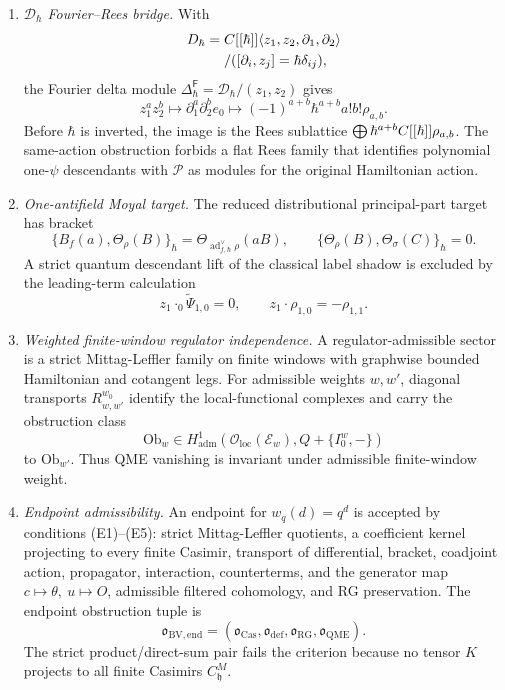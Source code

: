 \begin{enumerate}
  \item \emph{\(\mathcal D_\hbar\) Fourier--Rees bridge.}
  With
  \[
    \begin{aligned}
    D_\hbar
    ={}&
    C[[\hbar]]
      \langle z_1,z_2,\partial_1,\partial_2\rangle\\
    &/
      ([\partial_i,z_j]=\hbar\delta_{ij}),
    \end{aligned}
  \]
  the Fourier delta module
  \(\Delta^{\mathsf F}_\hbar=\mathcal D_\hbar/(z_1,z_2)\) gives
  \[
    z_1^az_2^b\mapsto
    \partial_1^a\partial_2^be_0
    \mapsto
    (-1)^{a+b}\hbar^{a+b}a!b!\rho_{a,b}.
  \]
  Before \(\hbar\) is inverted, the image is the Rees sublattice
  \(\bigoplus\hbar^{a+b}C[[\hbar]]\rho_{a,b}\).  The same-action
  obstruction forbids a flat Rees family that identifies polynomial
  one-\(\psi\) descendants with \(\mathcal P\) as modules for the
  original Hamiltonian action.

  \item \emph{One-antifield Moyal target.}
  The reduced distributional principal-part target has bracket
  \[
    \{B_f(a),\Theta_\rho(B)\}_\hbar
      =
      \Theta_{\operatorname{ad}^{\vee}_{f,\hbar}\rho}(aB),
    \qquad
    \{\Theta_\rho(B),\Theta_\sigma(C)\}_\hbar=0.
  \]
  A strict quantum descendant lift of the classical label shadow is
  excluded by the leading-term calculation
  \[
    z_1\cdot_0\widetilde\Psi_{1,0}=0,\qquad
    z_1\cdot\rho_{1,0}=-\rho_{1,1}.
  \]

  \item \emph{Weighted finite-window regulator independence.}
  A regulator-admissible sector is a strict Mittag-Leffler family on
  finite windows with graphwise bounded Hamiltonian and cotangent legs.
  For admissible weights \(w,w'\), diagonal transports
  \(R^{w_0}_{w,w'}\) identify the local-functional complexes and carry
  the obstruction class
  \[
    \mathrm{Ob}_w\in
    H^1_{\mathrm{adm}}(\mathcal O_{\mathrm{loc}}(\mathcal E_w),
      Q+\{I_0^w,-\})
  \]
  to \(\mathrm{Ob}_{w'}\).  Thus QME vanishing is invariant under
  admissible finite-window weight.

  \item \emph{Endpoint admissibility.}
  An endpoint for \(w_q(d)=q^d\) is accepted by conditions (E1)--(E5):
  strict Mittag-Leffler quotients, a coefficient kernel projecting to
  every finite Casimir, transport of differential, bracket, coadjoint
  action, propagator, interaction, counterterms, and the generator map
  \(c\mapsto\theta,\ u\mapsto O\), admissible filtered cohomology, and
  RG preservation.  The endpoint obstruction tuple is
  \[
    \mathfrak o_{\mathrm{BV,end}}
    =
    (\mathfrak o_{\mathrm{Cas}},
     \mathfrak o_{\mathrm{def}},
     \mathfrak o_{\mathrm{RG}},
     \mathfrak o_{\mathrm{QME}}).
  \]
  The strict product/direct-sum pair fails the criterion because no
  tensor \(K\) projects to all finite Casimirs
  \(C^M_{\mathfrak h}\).


\end{enumerate}
